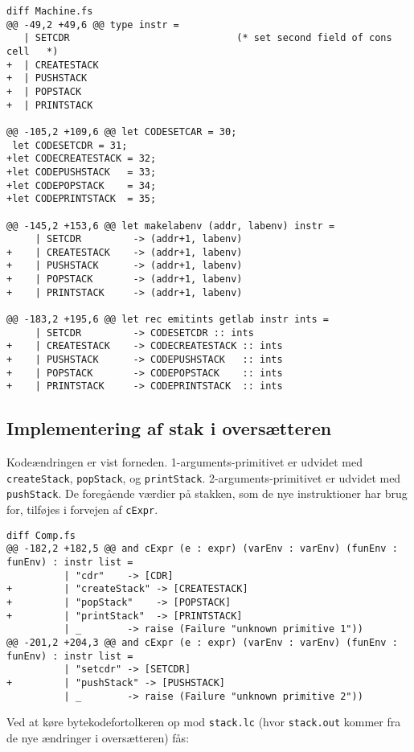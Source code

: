 \begin{verbatim}
diff Machine.fs
@@ -49,2 +49,6 @@ type instr =
   | SETCDR                             (* set second field of cons cell   *)
+  | CREATESTACK
+  | PUSHSTACK
+  | POPSTACK
+  | PRINTSTACK
 
@@ -105,2 +109,6 @@ let CODESETCAR = 30;
 let CODESETCDR = 31;
+let CODECREATESTACK = 32;
+let CODEPUSHSTACK   = 33;
+let CODEPOPSTACK    = 34;
+let CODEPRINTSTACK  = 35;
 
@@ -145,2 +153,6 @@ let makelabenv (addr, labenv) instr =
     | SETCDR         -> (addr+1, labenv)
+    | CREATESTACK    -> (addr+1, labenv)
+    | PUSHSTACK      -> (addr+1, labenv)
+    | POPSTACK       -> (addr+1, labenv)
+    | PRINTSTACK     -> (addr+1, labenv)
 
@@ -183,2 +195,6 @@ let rec emitints getlab instr ints =
     | SETCDR         -> CODESETCDR :: ints
+    | CREATESTACK    -> CODECREATESTACK :: ints
+    | PUSHSTACK      -> CODEPUSHSTACK   :: ints
+    | POPSTACK       -> CODEPOPSTACK    :: ints
+    | PRINTSTACK     -> CODEPRINTSTACK  :: ints
\end{verbatim}

\subsection{Implementering af stak i oversætteren}

Kodeændringen er vist forneden. 1-arguments-primitivet er udvidet med \texttt{createStack}, \texttt{popStack}, og \texttt{printStack}. 2-arguments-primitivet er udvidet med \texttt{pushStack}. De foregående værdier på stakken, som de nye instruktioner har brug for, tilføjes i forvejen af \texttt{cExpr}.

\begin{verbatim}
diff Comp.fs
@@ -182,2 +182,5 @@ and cExpr (e : expr) (varEnv : varEnv) (funEnv : funEnv) : instr list =
          | "cdr"    -> [CDR]
+         | "createStack" -> [CREATESTACK]
+         | "popStack"    -> [POPSTACK]
+         | "printStack"  -> [PRINTSTACK]
          | _        -> raise (Failure "unknown primitive 1"))
@@ -201,2 +204,3 @@ and cExpr (e : expr) (varEnv : varEnv) (funEnv : funEnv) : instr list =
          | "setcdr" -> [SETCDR]
+         | "pushStack" -> [PUSHSTACK]
          | _        -> raise (Failure "unknown primitive 2"))
\end{verbatim}

Ved at køre bytekodefortolkeren op mod \texttt{stack.lc} (hvor \texttt{stack.out} kommer fra de nye ændringer i oversætteren) fås:

